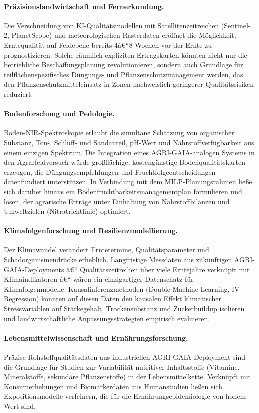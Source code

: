 ﻿\documentclass[12pt,a4paper]{article}
\theoremstyle{plain}
\theoremstyle{definition}
\begin{document}
	\paragraph{Präzisionslandwirtschaft und Fernerkundung.}
	Die Verschneidung von KI-Qualitäts\-modellen mit Satellitenzeitreichen
	(Sentinel-2, PlanetScope) und meteorologischen Raster\-daten eröffnet die
	Möglichkeit, Erntequalität auf Feldebene bereits 4â€“8 Wochen vor der Ernte
	zu prognostizieren. Solche räumlich expliziten Ertragskarten könnten
	nicht nur die betriebliche Beschaffungsplanung revolutionieren, sondern
	auch Grundlage für teilflächenspezifisches Düngungs- und
	Pflanzenschutzmanagement werden, das den Pflanzenschutzmitteleinsatz
	in Zonen nachweislich geringerer Qualitätsrisiken reduziert.

	\paragraph{Bodenforschung und Pedologie.}
	Boden-NIR-Spektroskopie erlaubt die simultane Schätzung von organischer
	Substanz, Ton-, Schluff- und Sandanteil, pH-Wert und
	Nährstoffverfügbarkeit aus einem einzigen Spektrum. Die Integration
	eines AGRI-GAIA-analogen Systems in den Agrarfeldversuch würde
	großflächige, kostengünstige Bodenqualitätskarten erzeugen, die
	Düngungsempfehlungen und Fruchtfolgeentscheidungen datenfundiert
	unterstützen. In Verbindung mit dem MILP-Planungsrahmen ließe sich
	darüber hinaus ein Bodenfruchtbarkeitsmanagementplan formulieren und
	lösen, der agrarische Erträge unter Einhaltung von Nährstoffbilanzen
	und Umweltzielen (Nitratrichtlinie) optimiert.

	\paragraph{Klimafolgenforschung und Resilienzmodellierung.}
	Der Klimawandel verändert Erntetermine, Qualitätsparameter und
	Schadorganismendrücke erheblich. Langfristige Messdaten aus zukünftigen
	AGRI-GAIA-Deployments â€“ Qualitätszeitreihen über viele Erntejahre
	verknüpft mit Klimaindikatoren â€“ wären ein einzigartiger Datenschatz
	für Klimafolgenmodelle. Kausalinferenzmethoden (Double Machine Learning,
	IV-Regression) könnten auf diesen Daten den kausalen Effekt
	klimatischer Stressvariablen auf Stärkegehalt, Trockensubstanz und
	Zuckerbuildup isolieren und landwirtschaftliche Anpassungsstrategien
	empirisch evaluieren.

	\paragraph{Lebensmittelwissenschaft und Ernährungsforschung.}
	Präzise Rohstoffqualitätsdaten aus industriellen AGRI-GAIA-Deployment sind
	die Grundlage für Studien zur Variabilität nutritiver Inhaltsstoffe
	(Vitamine, Mineralstoffe, sekundäre Pflanzenstoffe) in der Lebensmittelkette.
	Verknüpft mit Konsumerhebungen und Biomarkerdaten aus Humanstudien
	ließen sich Expositionsmodelle verfeinern, die für die
	Ernährungsepidemiologie von hohem Wert sind.
\end{document}

